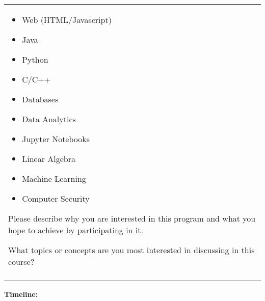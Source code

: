 \documentclass[12pt]{article}
\renewcommand{\_}{\kern-1.5pt\textunderscore\kern-1.5pt}
\begin{document}
\begin{table}[H]
\begin{small}
\begin{tabular}{p{6.3in}}
{\begin{itemize}
	\item Web (HTML/Javascript) \par 	\item Java \par 	\item Python  \par 	\item C/C++ \par 	\item Databases  \par 	\item Data Analytics \par 	\item Jupyter Notebooks \par 	\item Linear Algebra \par 	\item Machine Learning  \par 	\item Computer Security 
\end{itemize} \par Please describe why you are interested in this program and what you hope to achieve by participating in it. \par What topics or concepts are you most interested in discussing in this course?  \par } \\
\hhline{-}

\end{tabular}
\end{small}
 \end{table}


\textbf{Timeline: }\par
\end{document}

